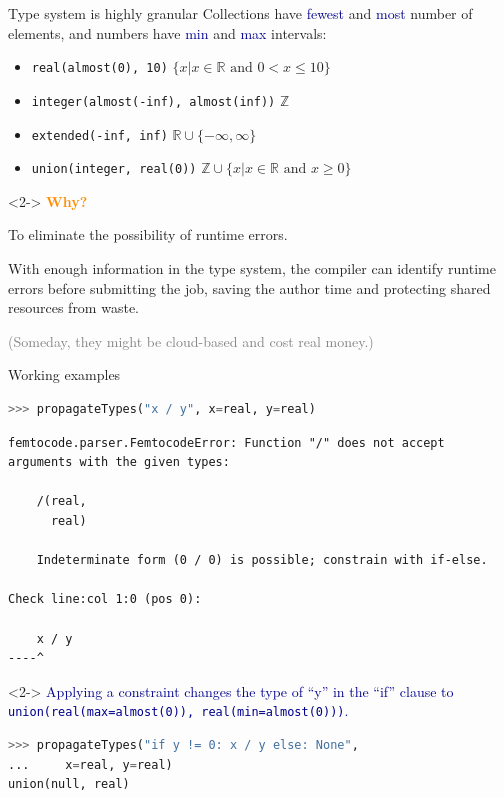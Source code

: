 \documentclass{beamer}
\begin{document}
\begin{frame}{Type system is highly granular}
\vspace{0.5 cm}
Collections have \textcolor{darkblue}{fewest} and \textcolor{darkblue}{most} number of elements, and numbers have \textcolor{darkblue}{min} and \textcolor{darkblue}{max} intervals:
\begin{itemize}
\item {\tt\small real(almost(0), 10)} \hfill $\{x | x \in \mathbb{R}\mbox{ and } 0 < x \le 10\}$
\item {\tt\small integer(almost(-inf), almost(inf))} \hfill $\mathbb{Z}$
\item {\tt\small extended(-inf, inf)} \hfill $\mathbb{R} \cup \{-\infty, \infty\}$
\item {\tt\small union(integer, real(0))} \hfill $\mathbb{Z} \cup \{x | x \in \mathbb{R}\mbox{ and } x \ge 0\}$
\end{itemize}

\vfill
\begin{uncoverenv}<2->
\textcolor{darkorange}{\bf Why?}

\vspace{0.2 cm}
To eliminate the possibility of runtime errors.

\vspace{0.2 cm}
With enough information in the type system, the compiler can identify runtime errors before submitting the job, saving the author time and protecting shared resources from waste.

\vspace{0.2 cm}
\textcolor{gray}{(Someday, they might be cloud-based and cost real money.)}
\end{uncoverenv}
\end{frame}

\begin{frame}[fragile]{Working examples}
\vspace{0.2 cm}
\begin{lstlisting}[language=python]
>>> propagateTypes("x / y", x=real, y=real)
\end{lstlisting}
\color{red}
\begin{lstlisting}[basicstyle=\ttfamily\scriptsize]
femtocode.parser.FemtocodeError: Function "/" does not accept arguments with the given types:

    /(real,
      real)

    Indeterminate form (0 / 0) is possible; constrain with if-else.

Check line:col 1:0 (pos 0):

    x / y
----^
\end{lstlisting}

\begin{uncoverenv}<2->
\textcolor{darkblue}{Applying a constraint changes the type of ``y'' in the ``if'' clause to {\tt\small union(real(max=almost(0)), real(min=almost(0)))}.}
\color{black}
\begin{lstlisting}[language=python]
>>> propagateTypes("if y != 0: x / y else: None",
...     x=real, y=real)
union(null, real)
\end{lstlisting}
\end{uncoverenv}
\end{frame}
\end{document}
